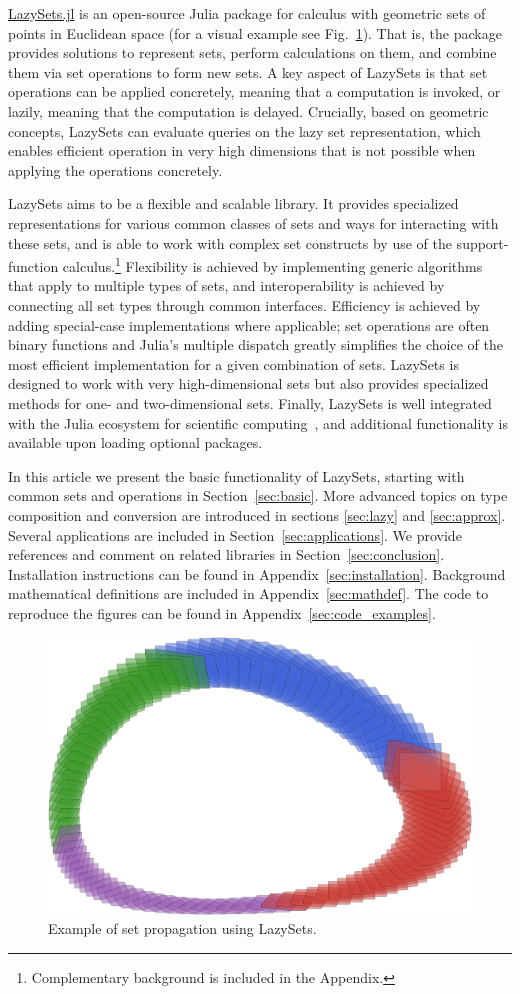 \href{https://github.com/JuliaReach/LazySets.jl}{LazySets.jl} is an open-source Julia package for calculus with geometric sets of points in Euclidean space (for a visual example see Fig.~\ref{fig:lotka_volterra}).
That is, the package provides solutions to represent sets, perform calculations on them, and combine them via set operations to form new sets.
A key aspect of LazySets is that set operations can be applied concretely, meaning that a computation is invoked, or lazily, meaning that the computation is delayed.
Crucially, based on geometric concepts, LazySets can evaluate queries on the lazy set representation, which enables efficient operation in very high dimensions that is not possible when applying the operations concretely.

\smallskip

LazySets aims to be a flexible and scalable library.
%
It provides specialized representations for various common classes of sets and ways for interacting with these sets, and is able to work with complex set constructs by use of the support-function calculus.\footnote{Complementary background is included in the Appendix.}
%
Flexibility is achieved by implementing generic algorithms that apply to multiple types of sets, and interoperability is achieved by connecting all set types through common interfaces.
%
Efficiency is achieved by adding special-case implementations where applicable; set operations are often binary functions and Julia's multiple dispatch greatly simplifies the choice of the most efficient implementation for a given combination of sets.
%
LazySets is designed to work with very high-dimensional sets but also provides specialized methods for one- and two-dimensional sets.
%
Finally, LazySets is well integrated with the Julia ecosystem for scientific computing~\cite{bezanson2017julia}, and additional functionality is available upon loading optional packages.
%

\smallskip

In this article we present the basic functionality of LazySets, starting with common sets and operations in Section~\ref{sec:basic}.
%
More advanced topics on type composition and conversion are introduced in sections \ref{sec:lazy} and \ref{sec:approx}.
%
Several applications are included in Section~\ref{sec:applications}.
%
We provide references and comment on related libraries in Section~\ref{sec:conclusion}.
%
Installation instructions can be found in Appendix~\ref{sec:installation}.
%
Background mathematical definitions are included in Appendix~\ref{sec:mathdef}.
%
The code to reproduce the figures can be found in Appendix~\ref{sec:code_examples}.

\begin{figure}[t]
	\centering
	\includegraphics[width=0.7\linewidth, keepaspectratio]{img/lotkavolterra}
	\vspace*{1mm}
	\caption{Example of set propagation using LazySets.}
	\label{fig:lotka_volterra}
\end{figure}
